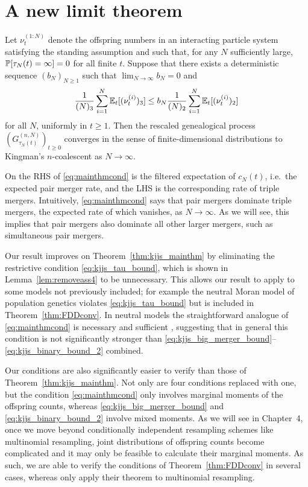 \section{A new limit theorem \seb{$\checkmark$} }

\begin{theorem}\label{thm:FDDconv}
Let $\nu_t^{(1:N)}$ denote the offspring numbers in an interacting particle system satisfying the standing assumption and such that, for any $N$ sufficiently large, $\mathbb{P}[ \tau_N(t) = \infty ] =0$ for all finite $t$. Suppose that there exists a deterministic sequence $(b_N)_{N\geq1}$ such that ${\lim}_{N\to\infty} b_N =0$ and
\begin{equation}\label{eq:mainthmcond}
\frac{1}{(N)_3} \sum_{i = 1}^N \mathbb{E}_t[ (\nu_t^{(i)})_3 ]  \leq b_N \frac{1}{(N)_2} \sum_{i = 1}^N \mathbb{E}_t[ (\nu_t^{(i)})_2 ]
\end{equation}
for all $N$, uniformly in $t \geq 1$.
Then the rescaled genealogical process $(G_{\tau_N(t)}^{(n,N)})_{t\geq0}$ converges in the sense of finite-dimensional distributions to Kingman's $n$-coalescent as $N \to \infty$.
\end{theorem}

On the RHS of \eqref{eq:mainthmcond} is the filtered expectation of $c_N(t)$, i.e.\ the expected pair merger rate, and the LHS is the corresponding rate of triple mergers. Intuitively, \eqref{eq:mainthmcond} says that pair mergers dominate triple mergers, the expected rate of which vanishes, as $N\to\infty$. As we will see, this implies that pair mergers also dominate all other larger mergers, such as simultaneous pair mergers.

Our result improves on Theorem~\ref{thm:kjjs_mainthm} by eliminating the restrictive condition \eqref{eq:kjjs_tau_bound}, which is shown in Lemma~\ref{lem:removeass4} to be unnecessary. This allows our result to apply to some models not previously included; for example the neutral Moran model of population genetics violates \eqref{eq:kjjs_tau_bound} but is included in Theorem~\ref{thm:FDDconv}. 
In neutral models the straightforward analogue of \eqref{eq:mainthmcond} is necessary and sufficient \parencite[Theorem 5.4]{mohle2003}, suggesting that in general this condition is not significantly stronger than \eqref{eq:kjjs_big_merger_bound}--\eqref{eq:kjjs_binary_bound_2} combined.

Our conditions are also significantly easier to verify than those of Theorem~\ref{thm:kjjs_mainthm}. Not only are four conditions replaced with one, but the condition \eqref{eq:mainthmcond} only involves marginal moments of the offspring counts, whereas \eqref{eq:kjjs_big_merger_bound} and \eqref{eq:kjjs_binary_bound_2} involve mixed moments. 
As we will see in Chapter~4, once we move beyond conditionally independent resampling schemes like multinomial resampling, joint distributions of offspring counts become complicated and it may only be feasible to calculate their marginal moments. 
As such, we are able to verify the conditions of Theorem~\ref{thm:FDDconv} in several cases, whereas \textcite{koskela2018} only apply their theorem to multinomial resampling.


